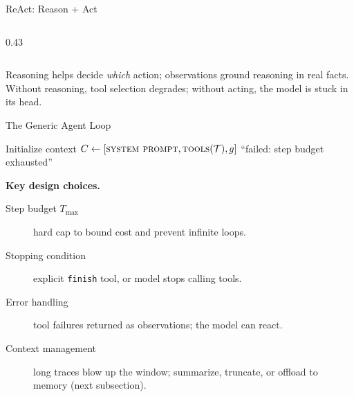 \begin{frame}[fragile]{ReAct: Reason + Act}
\begin{columns}
\begin{column}{0.43\textwidth}
\begin{center}
      \end{center}
    \end{column}
  \end{columns}

  \vspace{0.3em}
  Reasoning helps decide \emph{which} action; observations ground reasoning in real
  facts. Without reasoning, tool selection degrades; without acting, the model is stuck
  in its head.
\end{frame}

\begin{frame}{The Generic Agent Loop}

  \begin{algorithm}[H]
  \small
  \caption{Generic LLM agent loop}
  Initialize context $C \leftarrow [\textsc{system prompt}, \textsc{tools}(\mathcal{T}), g]$\;
  \Return ``failed: step budget exhausted''\;
  \end{algorithm}

  \vspace{0.4em}
  \textbf{Key design choices.}
  \begin{description}
    \item[Step budget $T_{\max}$] hard cap to bound cost and prevent infinite loops.
    \item[Stopping condition] explicit \texttt{finish} tool, or model stops calling tools.
    \item[Error handling] tool failures returned as observations; the model can react.
    \item[Context management] long traces blow up the window; summarize, truncate, or offload to memory (next subsection).
  \end{description}
\end{frame}


